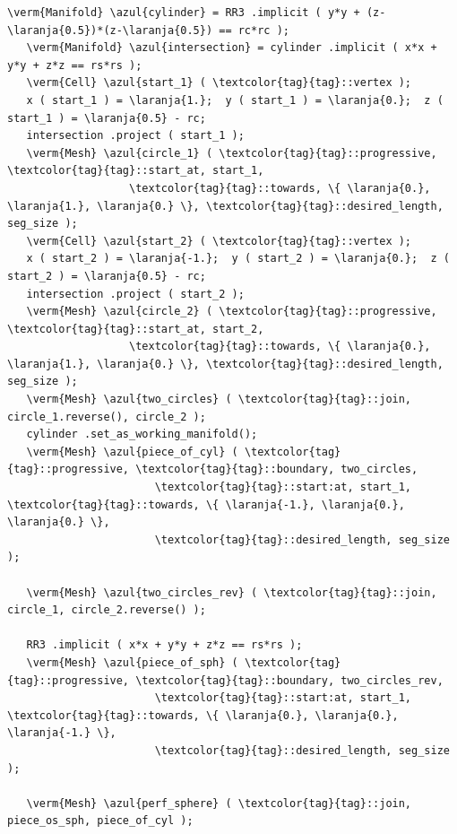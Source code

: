 \begin{Verbatim}[commandchars=\\\{\},formatcom=\small\tt,frame=single,
   label=parag-\ref{\numb section 3.\numb parag 19}.cpp,rulecolor=\color{coment},
   baselinestretch=0.94,framesep=2mm                                            ]
   \verm{Manifold} \azul{cylinder} = RR3 .implicit ( y*y + (z-\laranja{0.5})*(z-\laranja{0.5}) == rc*rc );
   \verm{Manifold} \azul{intersection} = cylinder .implicit ( x*x + y*y + z*z == rs*rs );
   \verm{Cell} \azul{start_1} ( \textcolor{tag}{tag}::vertex );
   x ( start_1 ) = \laranja{1.};  y ( start_1 ) = \laranja{0.};  z ( start_1 ) = \laranja{0.5} - rc;
   intersection .project ( start_1 );
   \verm{Mesh} \azul{circle_1} ( \textcolor{tag}{tag}::progressive, \textcolor{tag}{tag}::start_at, start_1,
                   \textcolor{tag}{tag}::towards, \{ \laranja{0.}, \laranja{1.}, \laranja{0.} \}, \textcolor{tag}{tag}::desired_length, seg_size );
   \verm{Cell} \azul{start_2} ( \textcolor{tag}{tag}::vertex );
   x ( start_2 ) = \laranja{-1.};  y ( start_2 ) = \laranja{0.};  z ( start_2 ) = \laranja{0.5} - rc;
   intersection .project ( start_2 );
   \verm{Mesh} \azul{circle_2} ( \textcolor{tag}{tag}::progressive, \textcolor{tag}{tag}::start_at, start_2,
                   \textcolor{tag}{tag}::towards, \{ \laranja{0.}, \laranja{1.}, \laranja{0.} \}, \textcolor{tag}{tag}::desired_length, seg_size );
   \verm{Mesh} \azul{two_circles} ( \textcolor{tag}{tag}::join, circle_1.reverse(), circle_2 );
   cylinder .set_as_working_manifold();
   \verm{Mesh} \azul{piece_of_cyl} ( \textcolor{tag}{tag}::progressive, \textcolor{tag}{tag}::boundary, two_circles,
                       \textcolor{tag}{tag}::start:at, start_1, \textcolor{tag}{tag}::towards, \{ \laranja{-1.}, \laranja{0.}, \laranja{0.} \},
                       \textcolor{tag}{tag}::desired_length, seg_size                         );

   \verm{Mesh} \azul{two_circles_rev} ( \textcolor{tag}{tag}::join, circle_1, circle_2.reverse() );

   RR3 .implicit ( x*x + y*y + z*z == rs*rs );
   \verm{Mesh} \azul{piece_of_sph} ( \textcolor{tag}{tag}::progressive, \textcolor{tag}{tag}::boundary, two_circles_rev,
                       \textcolor{tag}{tag}::start:at, start_1, \textcolor{tag}{tag}::towards, \{ \laranja{0.}, \laranja{0.}, \laranja{-1.} \},
                       \textcolor{tag}{tag}::desired_length, seg_size                         );

   \verm{Mesh} \azul{perf_sphere} ( \textcolor{tag}{tag}::join, piece_os_sph, piece_of_cyl );
\end{Verbatim}

